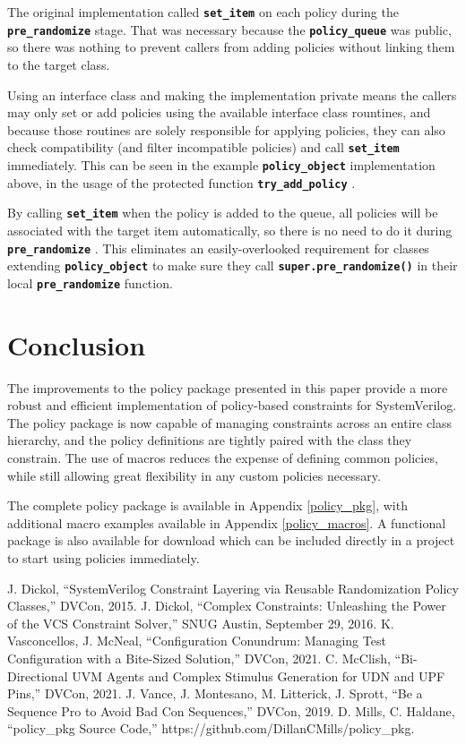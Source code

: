 \documentclass[conference,onecolumn]{IEEEtran}
\newcommand{\code}[1]{
\textbf{\texttt{#1}}
}
\begin{document}
The original implementation called \code{set_item} on each policy during the \code{pre_randomize} stage. That was necessary because the \code{policy_queue} was public, so there was nothing to prevent callers from adding policies without linking them to the target class.

Using an interface class and making the implementation private means the callers may only set or add policies using the available interface class rountines, and because those routines are solely responsible for applying policies, they can also check compatibility (and filter incompatible policies) and call \code{set_item} immediately. This can be seen in the example \code{policy_object} implementation above, in the usage of the protected function \code{try_add_policy}.

By calling \code{set_item} when the policy is added to the queue, all policies will be associated with the target item automatically, so there is no need to do it during \code{pre_randomize}. This eliminates an easily-overlooked requirement for classes extending \code{policy_object} to make sure they call \code{super.pre_randomize()} in their local \code{pre_randomize} function.

\section{Conclusion}

The improvements to the policy package presented in this paper provide a more robust and efficient implementation of policy-based constraints for SystemVerilog. The policy package is now capable of managing constraints across an entire class hierarchy, and the policy definitions are tightly paired with the class they constrain. The use of macros reduces the expense of defining common policies, while still allowing great flexibility in any custom policies necessary.

The complete policy package is available in Appendix \ref{policy_pkg}, with additional macro examples available in Appendix \ref{policy_macros}. A functional package is also available for download \cite{b6} which can be included directly in a project to start using policies immediately.

\begin{thebibliography}{00}
     J. Dickol, ``SystemVerilog Constraint Layering via Reusable Randomization Policy Classes,'' DVCon, 2015.
     J. Dickol, ``Complex Constraints: Unleashing the Power of the VCS Constraint Solver,'' SNUG Austin, September 29, 2016.
     K. Vasconcellos, J. McNeal, ``Configuration Conundrum: Managing Test Configuration with a Bite-Sized Solution,'' DVCon, 2021.
     C. McClish, ``Bi-Directional UVM Agents and Complex Stimulus Generation for UDN and UPF Pins,'' DVCon, 2021.
     J. Vance, J. Montesano, M. Litterick, J. Sprott, ``Be a Sequence Pro to Avoid Bad Con Sequences,'' DVCon, 2019.
     D. Mills, C. Haldane, ``policy\_pkg Source Code,'' https://github.com/DillanCMills/policy\_pkg.
\end{thebibliography}
\end{document}
